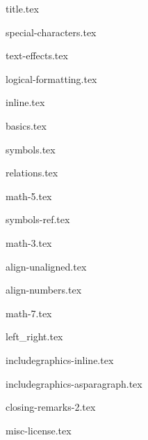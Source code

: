 \documentclass[allauthors,dutch]{../../cursuspresentatie}
\def\importslide#1#2{%
	{#2}
}
\begin{document}
\importslide{beginners_NL}{title.tex}


\importslide{beginners_NL}{special-characters.tex}



\importslide{text}{text-effects.tex}

\importslide{beginners_NL}{logical-formatting.tex}



\importslide{math}{inline.tex}
\importslide{math}{basics.tex}


\importslide{math}{symbols.tex}

\importslide{math}{relations.tex}




\importslide{beginners_NL}{math-5.tex}

\importslide{math}{symbols-ref.tex}

\importslide{beginners_NL}{math-3.tex}




\importslide{math}{align-unaligned.tex}


\importslide{math}{align-numbers.tex}

\importslide{beginners_NL}{math-7.tex}

\importslide{math}{left_right.tex}

\importslide{images}{includegraphics-inline.tex}
\importslide{images}{includegraphics-asparagraph.tex}


\importslide{beginners_NL}{closing-remarks-2.tex}
	
\importslide{misc}{misc-license.tex}
\end{document}
